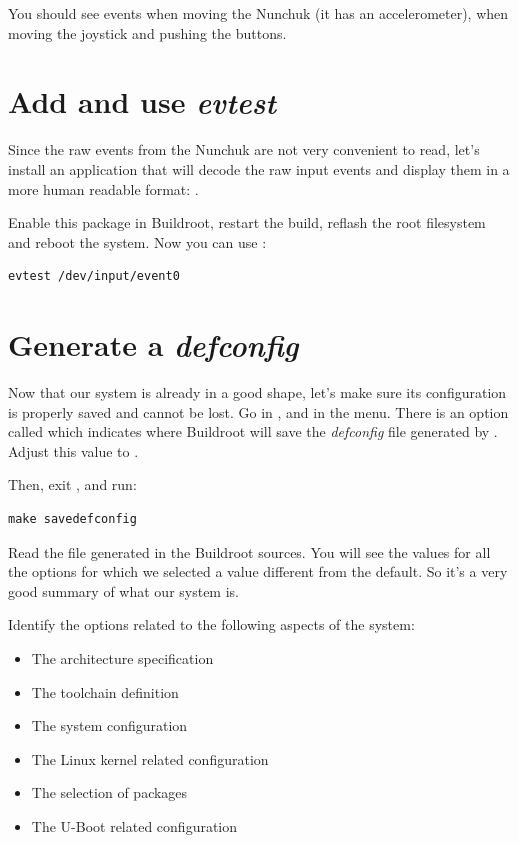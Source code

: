 You should see events when moving the Nunchuk (it has an
accelerometer), when moving the joystick and pushing the buttons.

\section{Add and use {\em evtest}}

Since the raw events from the Nunchuk are not very convenient to read,
let's install an application that will decode the raw input events
and display them in a more human readable format: .

Enable this package in Buildroot, restart the build, reflash the root
filesystem and reboot the system. Now you can use :

\begin{verbatim}
evtest /dev/input/event0
\end{verbatim}

\section{Generate a {\em defconfig}}

Now that our system is already in a good shape, let's make sure its
configuration is properly saved and cannot be lost. Go in
, and in the  menu. There is an
option called  which indicates
where Buildroot will save the {\em defconfig} file generated by
. Adjust this value to
.

Then, exit , and run:

\begin{verbatim}
make savedefconfig
\end{verbatim}

Read the file  generated in the
Buildroot sources. You will see the values for all the options for
which we selected a value different from the default. So it's a very
good summary of what our system is.

Identify the options related to the following aspects of the system:

\begin{itemize}
\item The architecture specification
\item The toolchain definition
\item The system configuration
\item The Linux kernel related configuration
\item The selection of packages
\item The U-Boot related configuration
\end{itemize}

